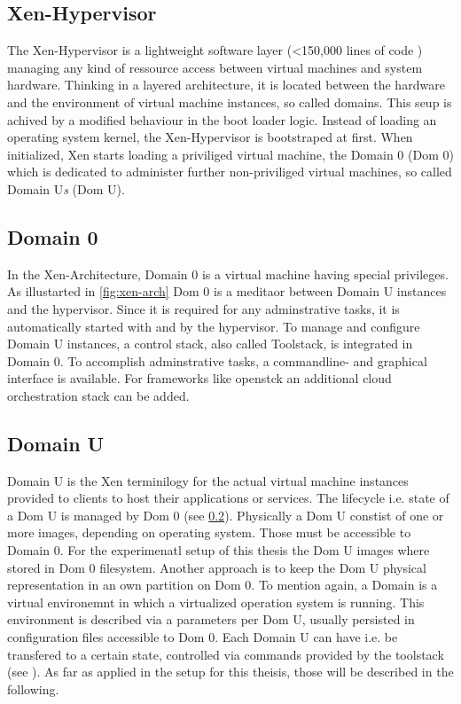 \subsection{Xen-Hypervisor}
The Xen-Hypervisor is a lightweight software layer (<150,000 lines of code \cite{xenprjct}) managing any kind of ressource access between virtual machines and system hardware. Thinking in a layered architecture, it is located between the hardware and the environment of virtual machine instances, so called domains. This seup is achived by a modified behaviour in the boot loader logic. Instead of loading an operating system kernel, the Xen-Hypervisor is bootstraped at first. When initialized, Xen starts loading a priviliged virtual machine, the Domain 0 (Dom 0)
which is dedicated to administer further non-priviliged virtual machines, so called Domain U{\small \textit{s}} (Dom U).

\subsection{Domain 0}\label{sub:dom0}
In the Xen-Architecture, Domain 0 is a virtual machine having special privileges. As illustarted in \ref{fig:xen-arch} Dom 0 is a meditaor between Domain U instances and the hypervisor. Since it is required for any adminstrative tasks, it is automatically started with and by the hypervisor. To manage and configure Domain U instances, a control stack, also called Toolstack, is integrated in Domain 0. To accomplish adminstrative tasks, a commandline- and graphical interface is available. For frameworks like \gls{openstck} an additional cloud orchestration stack can be added.

\subsection{Domain U}\label{sub:domu}
Domain U is the Xen terminilogy for the actual virtual machine instances provided to clients to host their applications or services. The lifecycle i.e. state of a Dom U is managed by Dom 0 (see \ref{sub:dom0}). Physically a Dom U constist of one or more images, depending on operating system. Those must be accessible to Domain 0. For the experimenatl setup of this thesis the Dom U images where stored in Dom 0 filesystem. Another approach is to keep the Dom U physical representation in an own partition on Dom 0. To mention again, a Domain is a virtual environemnt in which a virtualized operation system is running. This environment is described via a parameters per Dom U, usually persisted in configuration files accessible to Dom 0. Each Domain U can have i.e. be transfered to a certain state, controlled via commands provided by the toolstack (see \cite{xenxl}). As far as applied in the setup for this theisis, those will be described in the following.

